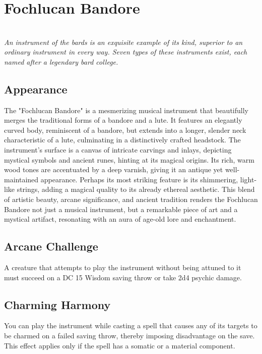 \ItemSubCategory{}

\chapter*{Fochlucan Bandore}
\\

\textit{An instrument of the bards is an exquisite example of its kind, superior to an ordinary instrument in every way. Seven types of these instruments exist, each named after a legendary bard college.}

\section*{Appearance}
The "Fochlucan Bandore" is a mesmerizing musical instrument that beautifully merges the traditional forms of a bandore and a lute. It features an elegantly curved body, reminiscent of a bandore, but extends into a longer, slender neck characteristic of a lute, culminating in a distinctively crafted headstock. The instrument's surface is a canvas of intricate carvings and inlays, depicting mystical symbols and ancient runes, hinting at its magical origins. Its rich, warm wood tones are accentuated by a deep varnish, giving it an antique yet well-maintained appearance. Perhaps its most striking feature is its shimmering, light-like strings, adding a magical quality to its already ethereal aesthetic. This blend of artistic beauty, arcane significance, and ancient tradition renders the Fochlucan Bandore not just a musical instrument, but a remarkable piece of art and a mystical artifact, resonating with an aura of age-old lore and enchantment.

\section*{Arcane Challenge}
A creature that attempts to play the instrument without being attuned to it must succeed on a DC 15 Wisdom saving throw or take 2d4 psychic damage.

\section*{Charming Harmony}
You can play the instrument while casting a spell that causes any of its targets to be charmed on a failed saving throw, thereby imposing disadvantage on the save. This effect applies only if the spell has a somatic or a material component.

